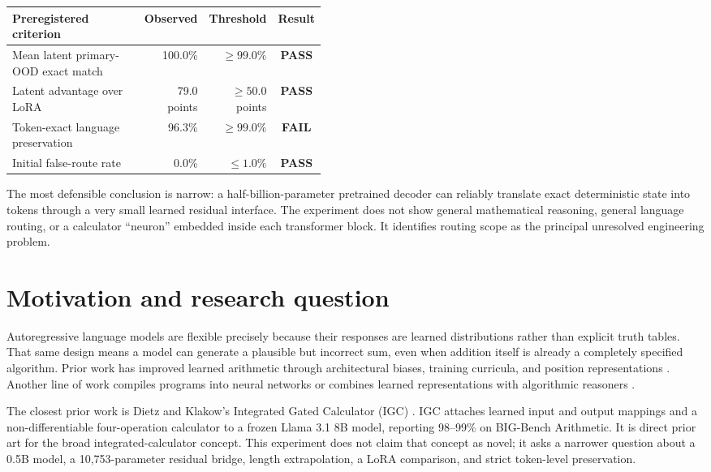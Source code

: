 \documentclass[11pt]{article}
\newcommand{\pass}{\textcolor{passgreen}{\textbf{PASS}}}
\newcommand{\fail}{\textcolor{warningorange}{\textbf{FAIL}}}
\begin{document}
\begin{center}
\begin{tabular}{p{0.45\linewidth}rrc}
\toprule
Preregistered criterion & Observed & Threshold & Result\\
\midrule
Mean latent primary-OOD exact match & 100.0\% & $\geq 99.0\%$ & \pass\\
Latent advantage over LoRA & 79.0 points & $\geq 50.0$ points & \pass\\
Token-exact language preservation & 96.3\% & $\geq 99.0\%$ & \fail\\
Initial false-route rate & 0.0\% & $\leq 1.0\%$ & \pass\\
\bottomrule
\end{tabular}
\end{center}

\noindent The most defensible conclusion is narrow: a half-billion-parameter
pretrained decoder can reliably translate exact deterministic state into
tokens through a very small learned residual interface. The experiment does
not show general mathematical reasoning, general language routing, or a
calculator ``neuron'' embedded inside each transformer block. It identifies
routing scope as the principal unresolved engineering problem.

\section{Motivation and research question}

Autoregressive language models are flexible precisely because their responses
are learned distributions rather than explicit truth tables. That same design
means a model can generate a plausible but incorrect sum, even when addition
itself is already a completely specified algorithm. Prior work has improved
learned arithmetic through architectural biases, training curricula, and
position representations \cite{trask2018,jelassi2023,cho2024}. Another line of
work compiles programs into neural networks or combines learned
representations with algorithmic reasoners \cite{lindner2023,bounsi2024,
saldyt2024}.

The closest prior work is Dietz and Klakow's Integrated Gated Calculator
(IGC) \cite{dietz2025}. IGC attaches learned input and output mappings and a
non-differentiable four-operation calculator to a frozen Llama 3.1 8B model,
reporting 98--99\% on BIG-Bench Arithmetic. It is direct prior art for the
broad integrated-calculator concept. This experiment does not claim that
concept as novel; it asks a narrower question about a 0.5B model, a
10,753-parameter residual bridge, length extrapolation, a LoRA comparison, and
strict token-level preservation.
\end{document}
